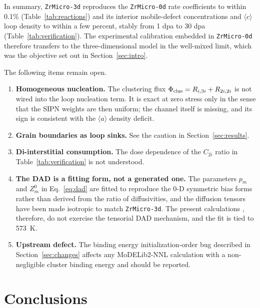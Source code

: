 \documentclass{article}
\newcommand{\aloop}{\ensuremath{\langle a\rangle}}
\newcommand{\cloop}{\ensuremath{\langle c\rangle}}
\newcommand{\ZrM}{\texttt{ZrMicro-3d}}
\newcommand{\MoD}{\textsf{MoDELib2-NNL}}
\newcommand{\ZrOd}{\texttt{ZrMicro-0d}}
\begin{document}
\label{sec:summary}%
In summary, {\ZrM} reproduces the {\ZrOd} rate coefficients to within 0.1\%
(Table~\ref{tab:reactions}) and its interior mobile-defect concentrations and
\cloop{} loop density to within a few percent, stably from 1 dpa to
30 dpa (Table~\ref{tab:verification}). The experimental calibration
embedded in {\ZrOd} therefore transfers to the three-dimensional model in the
well-mixed limit, which was the objective set out in Section~\ref{sec:intro}.

The following items remain open.

\begin{enumerate}
\item \textbf{Homogeneous nucleation.} The clustering flux
$\Phi_{\rm clus} = R_{i,3i} + R_{2i,2i}$ is not wired into the loop nucleation
term. It is exact at zero stress only in the sense that the SIPN weights are then
uniform; the channel itself is missing, and its sign is consistent with the
\aloop{} density deficit.
\item \textbf{Grain boundaries as loop sinks.} See the caution in
Section~\ref{sec:results}.
\item \textbf{Di-interstitial consumption.} The dose dependence of the $C_{2i}$
ratio in Table~\ref{tab:verification} is not understood.
\item \textbf{The DAD is a fitting form, not a generated one.} The parameters
$p_m$ and $Z^0_m$ in Eq.~\eqref{eq:dad} are fitted to reproduce the 0-D symmetric
bias forms rather than derived from the ratio of diffusivities, and the diffusion
tensors have been made isotropic to match \ZrM{}. The present calculations
, therefore, do not exercise the tensorial DAD mechanism, and the fit is tied to
573~K.
\item \textbf{Upstream defect.} The binding energy initialization-order bug
described in Section~\ref{sec:changes} affects any \MoD{} calculation with a
non-negligible cluster binding energy and should be reported.
\end{enumerate}



\section{Conclusions}
\end{document}
